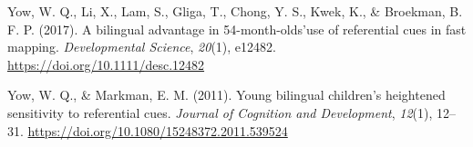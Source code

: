 \documentclass[
  english,
  ,man,floatsintext]{apa6}
\begin{document}
\leavevmode\hypertarget{ref-Yow_etal_2017}{}%
Yow, W. Q., Li, X., Lam, S., Gliga, T., Chong, Y. S., Kwek, K., \& Broekman, B. F. P. (2017). A bilingual advantage in 54-month-olds'use of referential cues in fast mapping. \emph{Developmental Science}, \emph{20}(1), e12482. \url{https://doi.org/10.1111/desc.12482}

\leavevmode\hypertarget{ref-Yow_Markman_2011}{}%
Yow, W. Q., \& Markman, E. M. (2011). Young bilingual children's heightened sensitivity to referential cues. \emph{Journal of Cognition and Development}, \emph{12}(1), 12--31. \url{https://doi.org/10.1080/15248372.2011.539524}

\endgroup
\end{document}
